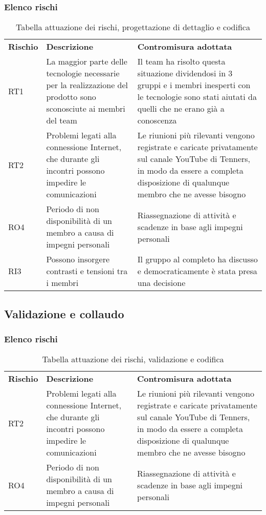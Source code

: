 \subsubsection{Elenco rischi}
\begin{longtable}{|p{2cm}|p{6cm}|p{6cm}|}
	\arrayrulecolor{white}
	\caption{Tabella attuazione dei rischi, progettazione di dettaglio e codifica} \\
	\hline
	\rowcolor{header}
	\textbf{Rischio} & \textbf{Descrizione} & \textbf{Contromisura adottata} \\
	\hline
	RT1 & La maggior parte delle tecnologie necessarie per la realizzazione del prodotto sono sconosciute ai membri del team & Il team ha risolto questa situazione dividendosi in 3 gruppi e i membri inesperti con le tecnologie sono stati aiutati da quelli che ne erano già a conoscenza\\
	RT2 & Problemi legati alla connessione Internet, che durante gli incontri possono impedire le comunicazioni & Le riunioni più rilevanti vengono registrate e caricate privatamente sul canale YouTube di Tenners, in modo da essere a completa disposizione di qualunque membro che ne avesse bisogno
	\\
	RO4 & Periodo di non disponibilità di un membro a causa di impegni personali & Riassegnazione di attività e scadenze in base agli impegni personali
	\\
	RI3 & Possono insorgere contrasti e tensioni tra i membri & Il gruppo al completo ha discusso e democraticamente è stata presa una decisione\\
	\hline
\end{longtable}


\newpage
\subsection{Validazione e collaudo}
\subsubsection{Elenco rischi}
\begin{longtable}{|p{2cm}|p{6cm}|p{6cm}|}
	\arrayrulecolor{white}
	\caption{Tabella attuazione dei rischi, validazione e codifica} \\
	\hline
	\rowcolor{header}
	\textbf{Rischio} & \textbf{Descrizione} & \textbf{Contromisura adottata} \\
	\hline
	RT2 & Problemi legati alla connessione Internet, che durante gli incontri possono impedire le comunicazioni & Le riunioni più rilevanti vengono registrate e caricate privatamente sul canale YouTube di Tenners, in modo da essere a completa disposizione di qualunque membro che ne avesse bisogno
	\\
	RO4 & Periodo di non disponibilità di un membro a causa di impegni personali & Riassegnazione di attività e scadenze in base agli impegni personali\\
	\hline
\end{longtable}